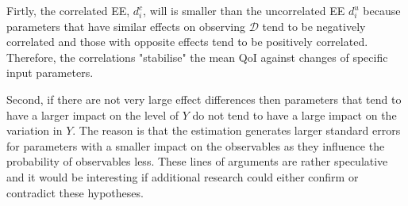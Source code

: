 Firtly, the correlated EE, $d_i^{c}$, will is smaller than the uncorrelated EE $d_i^{u}$ because parameters that have similar effects on observing $\pmb{\mathcal{D}}$ tend to be negatively correlated and those with opposite effects tend to be positively correlated. Therefore, the correlations "stabilise" the mean QoI against changes of specific input parameters.

Second, if there are not very large effect differences then parameters that tend to have a larger impact on the level of $Y$ do not tend to have a large impact on the variation in $Y$. The reason is that the estimation generates larger standard errors for parameters with a smaller impact on the observables as they influence the probability of observables less. These lines of arguments are rather speculative and it would be interesting if additional research could either confirm or contradict these hypotheses.
